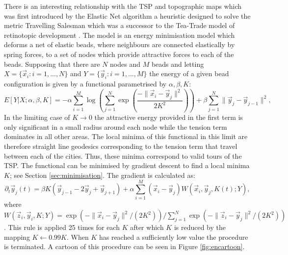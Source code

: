There is an interesting relationship with the TSP and topographic maps which was first introduced by the Elastic Net algorithm a heuristic designed to solve the metric Travelling Salesman which was a successor to the Tea-Trade model of retinotopic development \cite{Durbin1987-ki, Willshaw1976-ew}. The model is an energy minimisation model which deforms a net of elastic beads, where neighbours are connected elastically by spring forces, to a set of nodes which provide attractive forces to each of the beads. Supposing that there are $N$ nodes and $M$ beads and letting $X = \{\vec{x}_i : i = 1, ..., N \}$ and $Y = \{\vec{y}_i : i = 1, ..., M \}$ the energy of a given bead configuration is given by a functional parametrised by $\alpha, \beta, K$:
\begin{equation}
E[Y|X; \alpha, \beta, K] = -\alpha \sum_{i = 1}^{M} \log \left( \sum_{j=1}^N \exp\left ( \frac{- \lVert \vec{x}_i - \vec{y}_j \rVert^2 }{ 2 K^2 }  \right) \right) + \beta \sum_{j=1}^{N} \lVert \vec{y}_j - \vec{y}_{j-1} \rVert^2,
\end{equation}
In the limiting case of $K\rightarrow0$ the attractive energy provided in the first term is only significant in a small radius around each node while the tension term dominates in all other areas. The local minima of this functional in this limit are therefore straight line geodesics corresponding to the tension term that travel between each of the cities. Thus, these minima correspond to valid tours of the TSP. The functional can be minimised by gradient descent to find a local minima $K$; see Section \ref{sec:minimisation}. The gradient is calculated as:
\begin{equation}
\partial_t \vec{y}_j(t) = \beta K \left(\vec{y}_{j-1} - 2 \vec{y}_j + \vec{y}_{j+1}  \right) + \alpha \sum_{i = 1}^M (\vec{x}_i - \vec{y}_j) W(\vec{x}_i, \vec{y}_j, K(t); Y),
\end{equation}
where $W(\vec{z}_i, \vec{y}_i, K; Y) = \exp(- \lVert \vec{x}_i - \vec{y}_j \rVert^2 / (2 K^2)) / \sum_{j = 1}^N \exp(- \lVert \vec{z}_i - \vec{y}_j \rVert^2 / (2 K^2))$. This rule is applied 25 times for each $K$ after which $K$ is reduced by the mapping $K\leftarrow0.99K$. When $K$ has reached a sufficiently low value the procedure is terminated. A cartoon of this procedure can be seen in Figure \ref{fig:encartoon}.

